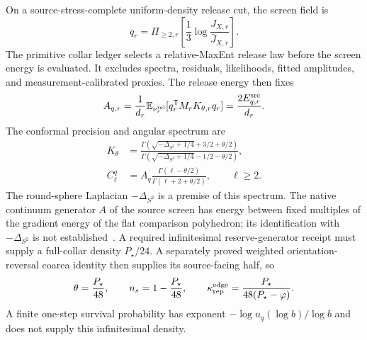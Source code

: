 \documentclass[11pt]{article}
\theoremstyle{remark}
\begin{document}
On a source-stress-complete uniform-density release cut, the screen field is
\begin{equation}
q_r=\Pi_{\ge2,r}\left[\frac13\log\frac{J_{X,r}}{\bar J_{X,r}}\right].
\end{equation}
The primitive collar ledger selects a relative-MaxEnt release law before the
screen energy is evaluated. It excludes spectra, residuals, likelihoods,
fitted amplitudes, and measurement-calibrated proxies. The release energy then
fixes
\begin{equation}
A_{q,r}=\frac1{d_r}\mathbb E_{\nu_r^{\rm rel}}
[q_r^{\mathsf T}M_rK_{\theta,r}q_r]
=\frac{2E_{q,r}^{\rm src}}{d_r}.
\end{equation}
The conformal precision and angular spectrum are
\begin{align}
K_\theta
&=\frac{\Gamma(\sqrt{-\Delta_{S^2}+1/4}+3/2+\theta/2)}
{\Gamma(\sqrt{-\Delta_{S^2}+1/4}-1/2-\theta/2)},\\
C_\ell^q
&=A_q\frac{\Gamma(\ell-\theta/2)}
{\Gamma(\ell+2+\theta/2)},\qquad \ell\ge2.
\end{align}
The round-sphere Laplacian \(-\Delta_{S^2}\) is a premise of this spectrum.
The native continuum generator \(A\) of the source screen has energy between
fixed multiples of the gradient energy of the flat comparison polyhedron;
its identification with \(-\Delta_{S^2}\) is not established~\cite{ophcontinuum}.
A required infinitesimal reserve-generator receipt must supply a full-collar
density \(P_\star/24\). A separately proved weighted
orientation-reversal coarea identity then supplies its source-facing half, so
\begin{equation}
\theta=\frac{P_\star}{48},\qquad
n_s=1-\frac{P_\star}{48},\qquad
\kappa_{\rm rep}^{\rm edge}=\frac{P_\star}{48(P_\star-\varphi)}.
\end{equation}
A finite one-step survival probability has exponent
\(-\log u_q(\log b)/\log b\) and does not supply this infinitesimal density.
\end{document}
